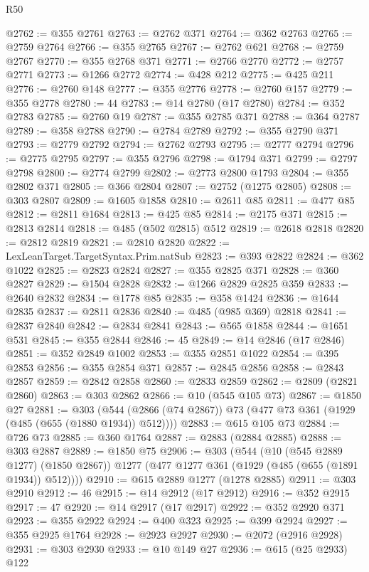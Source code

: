 \begin{lexlean}{R50}
\begin{coremodule}
@2762 := @355 @2761
@2763 := @2762 @371
@2764 := @362 @2763
@2765 := @2759 @2764
@2766 := @355 @2765
@2767 := @2762 @621
@2768 := @2759 @2767
@2770 := @355 @2768 @371
@2771 := @2766 @2770
@2772 := @2757 @2771
@2773 := @1266 @2772
@2774 := @428 @212
@2775 := @425 @211
@2776 := @2760 @148
@2777 := @355 @2776
@2778 := @2760 @157
@2779 := @355 @2778
@2780 := 44
@2783 := @14 @2780 (@17 @2780)
@2784 := @352 @2783
@2785 := @2760 @19
@2787 := @355 @2785 @371
@2788 := @364 @2787
@2789 := @358 @2788
@2790 := @2784 @2789
@2792 := @355 @2790 @371
@2793 := @2779 @2792
@2794 := @2762 @2793
@2795 := @2777 @2794
@2796 := @2775 @2795
@2797 := @355 @2796
@2798 := @1794 @371
@2799 := @2797 @2798
@2800 := @2774 @2799
@2802 := @2773 @2800 @1793
@2804 := @355 @2802 @371
@2805 := @366 @2804
@2807 := @2752 (@1275 @2805)
@2808 := @303 @2807
@2809 := @1605 @1858
@2810 := @2611 @85
@2811 := @477 @85
@2812 := @2811 @1684
@2813 := @425 @85
@2814 := @2175 @371
@2815 := @2813 @2814
@2818 := @485 (@502 @2815) @512
@2819 := @2618 @2818
@2820 := @2812 @2819
@2821 := @2810 @2820
@2822 := LexLeanTarget.TargetSyntax.Prim.natSub
@2823 := @393 @2822
@2824 := @362 @1022
@2825 := @2823 @2824
@2827 := @355 @2825 @371
@2828 := @360 @2827
@2829 := @1504 @2828
@2832 := @1266 @2829 @2825 @359
@2833 := @2640 @2832
@2834 := @1778 @85
@2835 := @358 @1424
@2836 := @1644 @2835
@2837 := @2811 @2836
@2840 := @485 (@985 @369) @2818
@2841 := @2837 @2840
@2842 := @2834 @2841
@2843 := @565 @1858
@2844 := @1651 @531
@2845 := @355 @2844
@2846 := 45
@2849 := @14 @2846 (@17 @2846)
@2851 := @352 @2849 @1002
@2853 := @355 @2851 @1022
@2854 := @395 @2853
@2856 := @355 @2854 @371
@2857 := @2845 @2856
@2858 := @2843 @2857
@2859 := @2842 @2858
@2860 := @2833 @2859
@2862 := @2809 (@2821 @2860)
@2863 := @303 @2862
@2866 := @10 (@545 @105 @73)
@2867 := @1850 @27
@2881 := @303
    (@544 (@2866 (@74 @2867)) @73 (@477 @73 @361 (@1929 (@485 (@655 (@1880 @1934)) @512))))
@2883 := @615 @105 @73
@2884 := @726 @73
@2885 := @360 @1764
@2887 := @2883 (@2884 @2885)
@2888 := @303 @2887
@2889 := @1850 @75
@2906 := @303
    (@544
      (@10 (@545 @2889 @1277) (@1850 @2867))
      @1277
      (@477 @1277 @361 (@1929 (@485 (@655 (@1891 @1934)) @512))))
@2910 := @615 @2889 @1277 (@1278 @2885)
@2911 := @303 @2910
@2912 := 46
@2915 := @14 @2912 (@17 @2912)
@2916 := @352 @2915
@2917 := 47
@2920 := @14 @2917 (@17 @2917)
@2922 := @352 @2920 @371
@2923 := @355 @2922
@2924 := @400 @323
@2925 := @399 @2924
@2927 := @355 @2925 @1764
@2928 := @2923 @2927
@2930 := @2072 (@2916 @2928)
@2931 := @303 @2930
@2933 := @10 @149 @27
@2936 := @615 (@25 @2933) @122

\end{coremodule}
\end{lexlean}
